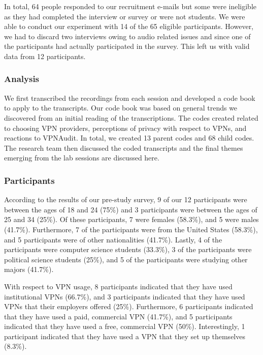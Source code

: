 In total, 64 people responded to our recruitment e-mails but some were ineligible as they had completed the interview or survey or were not students.
We were able to conduct our experiment with 14 of the 65 eligible participants.
However, we had to discard two interviews owing to audio related issues and since one of the participants had actually participated in the survey.
This left us with valid data from 12 participants.


 
\subsubsection{Analysis}
We first transcribed the recordings from each session and developed a code book to apply to the transcripts.
Our code book was based on general trends we discovered from an initial reading of the transcriptions.
The codes created related to choosing VPN providers, perceptions of privacy with respect to VPNs, and reactions to VPNAudit.
In total, we created 13 parent codes and 68 child codes.  The research team then discussed the coded transcripts and the final themes emerging from the lab sessions are discussed here.


\subsubsection{Participants} 
According to the results of our pre-study survey, 9 of our 12 participants were between the ages of 18 and 24 (75\%) and 3 participants were between the ages of 25 and 34 (25\%).
Of these participants, 7 were females (58.3\%), and 5 were males (41.7\%).
Furthermore, 7 of the participants were from the United States (58.3\%), and 5 participants were of other nationalities (41.7\%). 
Lastly, 4 of the participants were computer science students (33.3\%), 3 of the participants were political science students (25\%), and 5 of the participants were studying other majors (41.7\%).

With respect to VPN usage, 8 participants indicated that they have used institutional VPNs (66.7\%), and 3 participants indicated that they have used VPNs that their employers offered (25\%).
Furthermore, 6 participants indicated that they have used a paid, commercial VPN (41.7\%), and 5 participants indicated that they have used a free, commercial VPN (50\%).
Interestingly, 1 participant indicated that they have used a VPN that they set up themselves (8.3\%).


